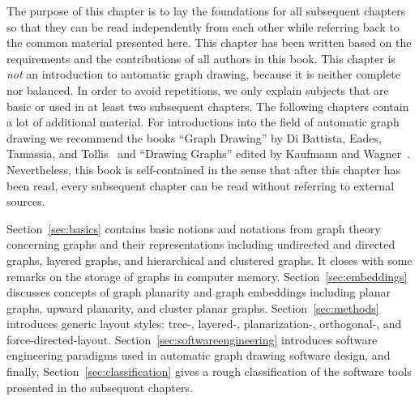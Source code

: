 \documentclass[runningheads]{cl2emult}
\begin{document}
The purpose of this chapter is to lay the foundations for all
subsequent chapters so that they can be read independently from each
other while referring back to the common material presented here. This
chapter has been written based on the requirements and the
contributions of all authors in this book. This chapter is \emph{not}
an introduction to automatic graph drawing, because it is neither
complete nor balanced. In order to avoid repetitions, we only explain
subjects that are basic or used in at least two subsequent chapters.
The following chapters contain a lot of additional material. For
introductions into the field of automatic graph drawing we recommend
the books ``Graph Drawing'' by Di Battista, Eades, Tamassia, and
Tollis~\cite{DETT99} and ``Drawing Graphs'' edited by Kaufmann and
Wagner~\cite{KW01}. Nevertheless, this book is self-contained in the
sense that after this chapter has been read, every subsequent chapter
can be read without referring to external sources.

Section~\ref{sec:basics} contains basic notions and notations from
graph theory concerning graphs and their representations including
undirected and directed graphs, layered graphs, and hierarchical and
clustered graphs.  It closes with some remarks on the storage of
graphs in computer memory. Section~\ref{sec:embeddings} discusses
concepts of graph planarity and graph embeddings including planar
graphs, upward planarity, and cluster planar graphs.
Section~\ref{sec:methods}
introduces generic layout styles: tree-, layered-, planarization-,
orthogonal-, and force-directed-layout.
Section~\ref{sec:softwareengineering} introduces software engineering
paradigms used in automatic graph drawing software design, and
finally, Section~\ref{sec:classification} gives a rough classification
of the software tools presented in the subsequent chapters.
\end{document}
